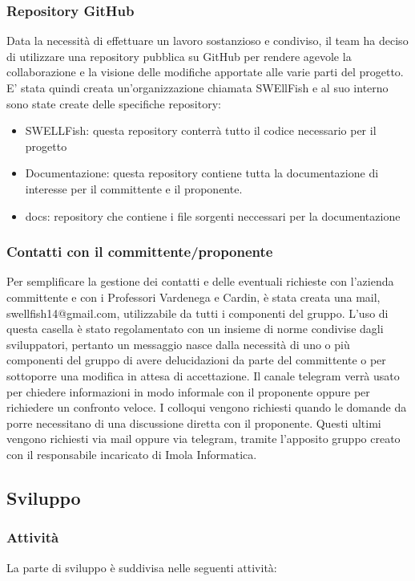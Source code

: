 \documentclass[12pt]{article}
\begin{document}
\subsubsection{Repository GitHub}
Data la necessità di effettuare un lavoro sostanzioso e condiviso, il team ha deciso di utilizzare una repository pubblica su GitHub per rendere agevole la collaborazione e la visione delle modifiche apportate alle varie parti del progetto.
E' stata quindi creata un'organizzazione chiamata SWEllFish e al suo interno sono state create delle specifiche repository:

\begin{itemize}
    \item SWELLFish: questa repository conterrà tutto il codice necessario per il progetto
    \item Documentazione: questa repository contiene tutta la documentazione di interesse per il committente e il proponente.
    \item docs: repository che contiene i file sorgenti neccessari per la documentazione
\end{itemize}

\subsubsection{Contatti con il committente/proponente}
Per semplificare la gestione dei contatti e delle eventuali richieste con l'azienda committente e con i Professori Vardenega e Cardin, è stata creata una mail, swellfish14@gmail.com, utilizzabile da tutti i componenti del gruppo.
L'uso di questa casella è stato regolamentato con un insieme di norme condivise dagli sviluppatori, pertanto un messaggio nasce dalla necessità di uno o più componenti del gruppo di avere delucidazioni da parte del committente o per sottoporre una modifica in attesa di accettazione.
Il canale telegram verrà usato per chiedere informazioni in modo informale con il proponente oppure per richiedere un confronto veloce.
I colloqui vengono richiesti quando le domande da porre necessitano di una discussione diretta con il proponente.
Questi ultimi vengono richiesti via mail oppure via telegram, tramite l'apposito gruppo creato con il responsabile incaricato di Imola Informatica.

\subsection{Sviluppo}
\subsubsection{Attività}
La parte di sviluppo è suddivisa nelle seguenti attività:
\end{document}
